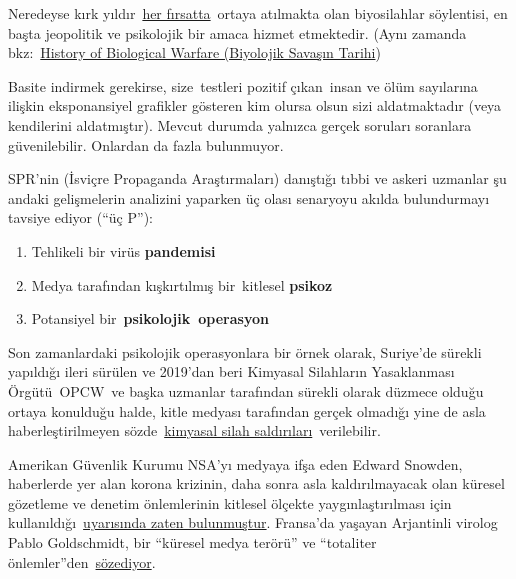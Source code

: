 Neredeyse kırk
yıldır~\href{https://www.wilsoncenter.org/blog-post/operation-denver-kgb-and-stasi-disinformation-regarding-aids}{her
fırsatta}~ortaya atılmakta olan biyosilahlar söylentisi, en başta
jeopolitik ve psikolojik bir amaca hizmet etmektedir. (Aynı zamanda
bkz:~\href{https://www.emedicinehealth.com/biological_warfare/article_em.htm}{History
of Biological Warfare (Biyolojik Savaşın Tarihi})

Basite indirmek gerekirse, size~testleri pozitif çıkan~insan ve ölüm
sayılarına ilişkin eksponansiyel grafikler gösteren kim olursa olsun
sizi aldatmaktadır (veya kendilerini aldatmıştır). Mevcut durumda
yalnızca gerçek soruları soranlara güvenilebilir. Onlardan da fazla
bulunmuyor.

SPR'nin (İsviçre Propaganda Araştırmaları) danıştığı tıbbi ve askeri
uzmanlar şu andaki gelişmelerin analizini yaparken üç olası senaryoyu
akılda bulundurmayı tavsiye ediyor (``üç P''):

\begin{enumerate}
\def\labelenumi{\arabic{enumi}.}
\tightlist
\item
  Tehlikeli bir virüs \textbf{pandemisi}
\item
  Medya tarafından kışkırtılmış bir~kitlesel \textbf{psikoz}
\item
  Potansiyel bir~\textbf{psikolojik~operasyon}
\end{enumerate}

Son zamanlardaki psikolojik operasyonlara bir örnek olarak, Suriye'de
sürekli yapıldığı ileri sürülen ve 2019'dan beri Kimyasal Silahların
Yasaklanması Örgütü~OPCW~ve başka uzmanlar tarafından sürekli olarak
düzmece olduğu ortaya konulduğu halde, kitle medyası tarafından gerçek
olmadığı yine de asla haberleştirilmeyen
sözde~\href{https://www.globalresearch.ca/the-bbc-saving-syrias-children-documentary-staged-events-fake-video-footage/5470158}{kimyasal
silah saldırıları}~verilebilir.

Amerikan Güvenlik Kurumu NSA'yı medyaya ifşa eden Edward Snowden,
haberlerde yer alan korona krizinin, daha sonra asla kaldırılmayacak
olan küresel gözetleme ve denetim önlemlerinin kitlesel ölçekte
yaygınlaştırılması için
kullanıldığı~\href{https://www.youtube.com/watch?v=9we6t2nObbw}{uyarısında
zaten bulunmuştur}. Fransa'da yaşayan Arjantinli virolog Pablo
Goldschmidt, bir ``küresel medya terörü'' ve ``totaliter
önlemler''den~\href{https://www.infobae.com/coronavirus/2020/03/28/para-un-prestigioso-cientifico-argentino-el-coronavirus-no-merece-que-el-planeta-este-en-un-estado-de-parate-total/}{sözediyor}.

